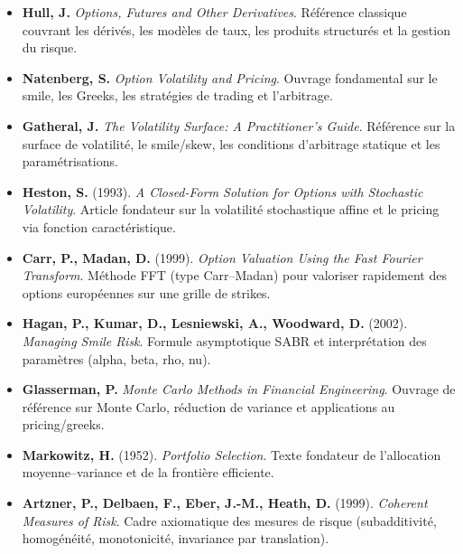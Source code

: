 \documentclass[11pt,a4paper]{article}
\newcommand{\1}{\mathbf{1}}
\begin{document}
\begin{itemize}
  \item \textbf{Hull, J.}
        \emph{Options, Futures and Other Derivatives}.
        Référence classique couvrant les dérivés, les modèles de taux, les
        produits structurés et la gestion du risque.

  \item \textbf{Natenberg, S.}
        \emph{Option Volatility and Pricing}.
        Ouvrage fondamental sur le smile, les Greeks, les stratégies de trading
        et l'arbitrage.

  \item \textbf{Gatheral, J.}
        \emph{The Volatility Surface: A Practitioner's Guide}.
        Référence sur la surface de volatilité, le smile/skew, les conditions d'arbitrage statique et les paramétrisations.

  \item \textbf{Heston, S.} (1993).
        \emph{A Closed-Form Solution for Options with Stochastic Volatility}.
        Article fondateur sur la volatilité stochastique affine et le pricing via fonction caractéristique.

  \item \textbf{Carr, P., Madan, D.} (1999).
        \emph{Option Valuation Using the Fast Fourier Transform}.
        Méthode FFT (type Carr--Madan) pour valoriser rapidement des options européennes sur une grille de strikes.

  \item \textbf{Hagan, P., Kumar, D., Lesniewski, A., Woodward, D.} (2002).
        \emph{Managing Smile Risk}.
        Formule asymptotique SABR et interprétation des paramètres (alpha, beta, rho, nu).

  \item \textbf{Glasserman, P.}
        \emph{Monte Carlo Methods in Financial Engineering}.
        Ouvrage de référence sur Monte Carlo, réduction de variance et applications au pricing/greeks.

  \item \textbf{Markowitz, H.} (1952).
        \emph{Portfolio Selection}.
        Texte fondateur de l'allocation moyenne--variance et de la frontière efficiente.

  \item \textbf{Artzner, P., Delbaen, F., Eber, J.-M., Heath, D.} (1999).
        \emph{Coherent Measures of Risk}.
        Cadre axiomatique des mesures de risque (subadditivité, homogénéité, monotonicité, invariance par translation).


\end{itemize}
\end{document}
